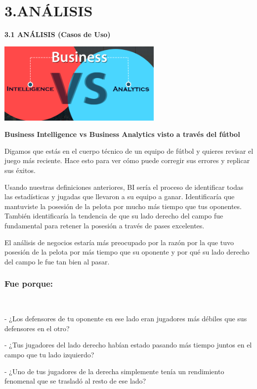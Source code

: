 \documentclass[a4paper,12pt,twocolumn]{article}
\begin{document}
\section*{3.ANÁLISIS} 
\textbf {3.1 ANÁLISIS (Casos de Uso)}\\
\begin{center}
\includegraphics[width=8cm]{./Imagenes/image01}
\end{center}
\begin{center}
\textbf{Business Intelligence vs Business Analytics visto a través del fútbol}\\
\end{center}
Digamos que estás en el cuerpo técnico de un equipo de fútbol y quieres revisar el juego más reciente. Hace esto para ver cómo puede corregir sus errores y replicar sus éxitos.
\item 
Usando nuestras definiciones anteriores,  BI  sería el proceso de identificar todas las estadísticas y jugadas que llevaron a su equipo a ganar. Identificaría que mantuviste la posesión de la pelota por mucho más tiempo que tus oponentes. También identificaría la tendencia de que su lado derecho del campo fue fundamental para retener la posesión a través de pases excelentes.
\item 
El análisis de negocios  estaría más preocupado por la  razón por la  que tuvo posesión de la pelota por más tiempo que su oponente y por qué su lado derecho del campo le fue tan bien al pasar.

\subsubsection*{Fue porque:}\\
\item - ¿Los defensores de tu oponente en ese lado eran jugadores más débiles que sus defensores en el otro?
\item - ¿Tus jugadores del lado derecho habían estado pasando más tiempo juntos en el campo que tu lado izquierdo?
\item - ¿Uno de tus jugadores de la derecha simplemente tenía un rendimiento fenomenal que se trasladó al resto de ese lado?
\end{document}
